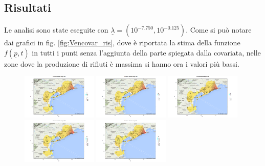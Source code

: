 \documentclass[a4paper,11pt,twoside,openright]{book}							%
\begin{document}
\subsection{Risultati}
Le analisi sono state eseguite con $\underline \lambda = (10^{-7.750}, 10^{-0.125})$. Come si può notare dai grafici in fig. \ref{fig:Vencovar_ris}, dove è riportata la stima della funzione $f(\underline p,t)$ in tutti i punti senza l'aggiunta della parte spiegata dalla covariata, nelle zone dove la produzione di rifiuti è massima si hanno ora i valori più bassi.
\newpage
\begin{figure}[H]
\centering
\includegraphics[trim=0cm 0cm 4cm 0cm,clip=true,width=0.32\textwidth]{Immagini/venezia_con_covariate/Maps1997.png}
\includegraphics[trim=0cm 0cm 4cm 0cm,clip=true,width=0.32\textwidth]{Immagini/venezia_con_covariate/Maps1998.png}
\includegraphics[trim=0cm 0cm 4cm 0cm,clip=true,width=0.32\textwidth]{Immagini/venezia_con_covariate/Maps1999.png}
\includegraphics[trim=0cm 0cm 4cm 0cm,clip=true,width=0.32\textwidth]{Immagini/venezia_con_covariate/Maps2000.png}
\includegraphics[trim=0cm 0cm 4cm 0cm,clip=true,width=0.32\textwidth]{Immagini/venezia_con_covariate/Maps2001.png}

\end{figure}
\end{document}
